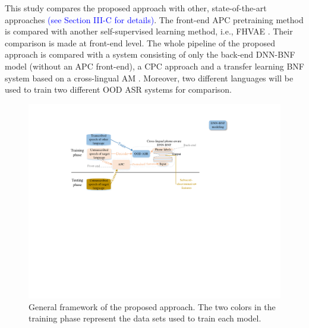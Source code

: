 \documentclass[transmag]{IEEEtran}
\begin{document}
This study compares the proposed approach with other, state-of-the-art approaches \textcolor{blue}{(see Section III-C for details)}. The front-end APC pretraining method is compared with another self-supervised learning method, i.e., FHVAE \cite{hsu2017nips}. Their comparison is made at  front-end level.
The whole pipeline of the proposed approach is compared with a system consisting of only the back-end DNN-BNF model (without an APC front-end), a CPC approach \cite{oord2018cpc}  and a transfer learning BNF system based on a cross-lingual AM  \cite{shibata2017composite}. Moreover, two different languages will be used to train two different OOD ASR systems for comparison.

\begin{figure}[!t]
    \centering
    \includegraphics[width=\linewidth]{apc_framework_detail_other_lang_revised_AQ.pdf}
    \caption{General framework of the proposed approach. The two colors in the training phase represent the data sets used to train each model.}
    \label{fig:general_framework}
\end{figure}
\end{document}
